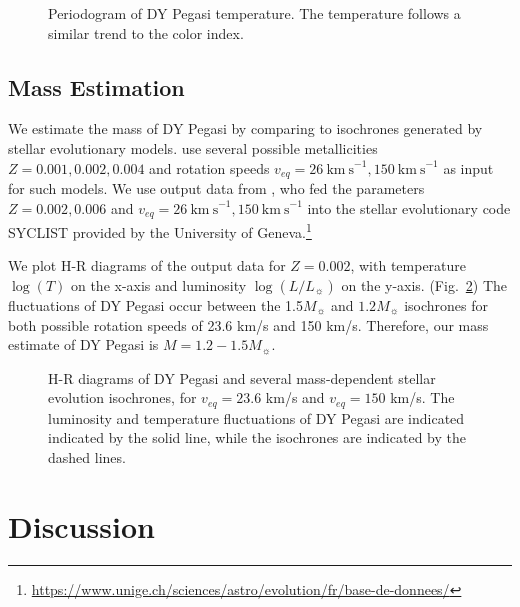 \documentclass[twocolumn]{aastex631}
\begin{document}
\begin{figure}
\caption{Periodogram of DY Pegasi temperature. The temperature follows a similar trend to the color index. \label{fig:periodogram_tempcurve}}
\end{figure}


\subsection{Mass Estimation} \label{subsec:mass}

We estimate the mass of DY Pegasi by comparing to isochrones generated by stellar evolutionary models. \citet{Xue_2020} use several possible metallicities $Z = 0.001, 0.002, 0.004$ and rotation speeds $v_{eq} = 26 \ \mathrm{km \ s}^{-1}, 150 \ \mathrm{km \ s}^{-1}$ as input for such models. We use output data from \citet{Eggenberger_2021}, who fed the parameters $Z = 0.002, 0.006$ and $v_{eq} = 26 \ \mathrm{km \ s}^{-1}, 150 \ \mathrm{km \ s}^{-1}$ into the stellar evolutionary code SYCLIST provided by the University of Geneva.\footnote{\url{https://www.unige.ch/sciences/astro/evolution/fr/base-de-donnees/}}

We plot H-R diagrams of the output data for $Z = 0.002$, with temperature $\log(T)$ on the x-axis and luminosity $\log(L/L_\sun)$ on the y-axis. (Fig.\ \ref{fig:hrdiagram}) The fluctuations of DY Pegasi occur between the 1.5$M_\sun$ and $1.2M_\sun$ isochrones for both possible rotation speeds of 23.6 km/s and 150 km/s. Therefore, our mass estimate of DY Pegasi is $M = 1.2-1.5 M_\sun$.

\begin{figure}
\caption{H-R diagrams of DY Pegasi and several mass-dependent stellar evolution isochrones, for $v_{eq} = 23.6$ km/s and $v_{eq} = 150$ km/s. The luminosity and temperature fluctuations of DY Pegasi are indicated indicated by the solid line, while the isochrones are indicated by the dashed lines. \label{fig:hrdiagram}}
\end{figure}


\section{Discussion} \label{subsec:discussion}
\end{document}
